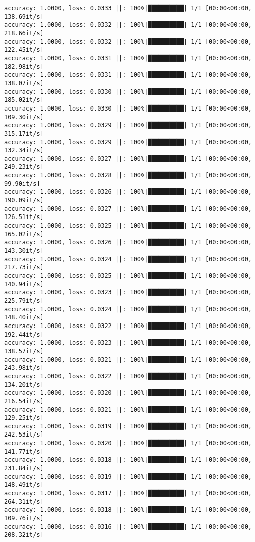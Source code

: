 \documentclass[
]{article}
\begin{document}
\begin{verbatim}
accuracy: 1.0000, loss: 0.0333 ||: 100%|██████████| 1/1 [00:00<00:00, 138.69it/s]
accuracy: 1.0000, loss: 0.0332 ||: 100%|██████████| 1/1 [00:00<00:00, 218.66it/s]
accuracy: 1.0000, loss: 0.0332 ||: 100%|██████████| 1/1 [00:00<00:00, 122.45it/s]
accuracy: 1.0000, loss: 0.0331 ||: 100%|██████████| 1/1 [00:00<00:00, 182.98it/s]
accuracy: 1.0000, loss: 0.0331 ||: 100%|██████████| 1/1 [00:00<00:00, 138.07it/s]
accuracy: 1.0000, loss: 0.0330 ||: 100%|██████████| 1/1 [00:00<00:00, 185.02it/s]
accuracy: 1.0000, loss: 0.0330 ||: 100%|██████████| 1/1 [00:00<00:00, 109.30it/s]
accuracy: 1.0000, loss: 0.0329 ||: 100%|██████████| 1/1 [00:00<00:00, 315.17it/s]
accuracy: 1.0000, loss: 0.0329 ||: 100%|██████████| 1/1 [00:00<00:00, 132.34it/s]
accuracy: 1.0000, loss: 0.0327 ||: 100%|██████████| 1/1 [00:00<00:00, 249.23it/s]
accuracy: 1.0000, loss: 0.0328 ||: 100%|██████████| 1/1 [00:00<00:00, 99.90it/s]
accuracy: 1.0000, loss: 0.0326 ||: 100%|██████████| 1/1 [00:00<00:00, 190.09it/s]
accuracy: 1.0000, loss: 0.0327 ||: 100%|██████████| 1/1 [00:00<00:00, 126.51it/s]
accuracy: 1.0000, loss: 0.0325 ||: 100%|██████████| 1/1 [00:00<00:00, 165.02it/s]
accuracy: 1.0000, loss: 0.0326 ||: 100%|██████████| 1/1 [00:00<00:00, 143.30it/s]
accuracy: 1.0000, loss: 0.0324 ||: 100%|██████████| 1/1 [00:00<00:00, 217.73it/s]
accuracy: 1.0000, loss: 0.0325 ||: 100%|██████████| 1/1 [00:00<00:00, 140.94it/s]
accuracy: 1.0000, loss: 0.0323 ||: 100%|██████████| 1/1 [00:00<00:00, 225.79it/s]
accuracy: 1.0000, loss: 0.0324 ||: 100%|██████████| 1/1 [00:00<00:00, 148.40it/s]
accuracy: 1.0000, loss: 0.0322 ||: 100%|██████████| 1/1 [00:00<00:00, 192.44it/s]
accuracy: 1.0000, loss: 0.0323 ||: 100%|██████████| 1/1 [00:00<00:00, 138.57it/s]
accuracy: 1.0000, loss: 0.0321 ||: 100%|██████████| 1/1 [00:00<00:00, 243.98it/s]
accuracy: 1.0000, loss: 0.0322 ||: 100%|██████████| 1/1 [00:00<00:00, 134.20it/s]
accuracy: 1.0000, loss: 0.0320 ||: 100%|██████████| 1/1 [00:00<00:00, 216.54it/s]
accuracy: 1.0000, loss: 0.0321 ||: 100%|██████████| 1/1 [00:00<00:00, 129.25it/s]
accuracy: 1.0000, loss: 0.0319 ||: 100%|██████████| 1/1 [00:00<00:00, 242.53it/s]
accuracy: 1.0000, loss: 0.0320 ||: 100%|██████████| 1/1 [00:00<00:00, 141.77it/s]
accuracy: 1.0000, loss: 0.0318 ||: 100%|██████████| 1/1 [00:00<00:00, 231.84it/s]
accuracy: 1.0000, loss: 0.0319 ||: 100%|██████████| 1/1 [00:00<00:00, 148.49it/s]
accuracy: 1.0000, loss: 0.0317 ||: 100%|██████████| 1/1 [00:00<00:00, 264.31it/s]
accuracy: 1.0000, loss: 0.0318 ||: 100%|██████████| 1/1 [00:00<00:00, 109.76it/s]
accuracy: 1.0000, loss: 0.0316 ||: 100%|██████████| 1/1 [00:00<00:00, 208.32it/s]

\end{verbatim}
\end{document}
